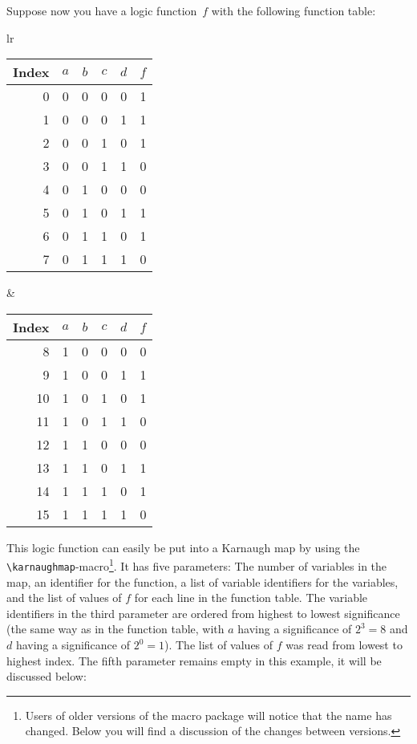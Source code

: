 \documentclass{article}
\begin{document}
Suppose now you have a logic function~$f$ with the following function table:

\begin{center}

    \begin{tabular}{lr}
        \begin{tabular}[t]{r|cccc|c}
            Index & $a$ & $b$ & $c$ & $d$ & $f$ \\
            \hline
            0     & 0   & 0   & 0   & 0   & 1   \\
            1     & 0   & 0   & 0   & 1   & 1   \\
            2     & 0   & 0   & 1   & 0   & 1   \\
            3     & 0   & 0   & 1   & 1   & 0   \\
            4     & 0   & 1   & 0   & 0   & 0   \\
            5     & 0   & 1   & 0   & 1   & 1   \\
            6     & 0   & 1   & 1   & 0   & 1   \\
            7     & 0   & 1   & 1   & 1   & 0   \\
        \end{tabular}
         &
        \begin{tabular}[t]{r|cccc|c}
            Index & $a$ & $b$ & $c$ & $d$ & $f$ \\
            \hline
            8     & 1   & 0   & 0   & 0   & 0   \\
            9     & 1   & 0   & 0   & 1   & 1   \\
            10    & 1   & 0   & 1   & 0   & 1   \\
            11    & 1   & 0   & 1   & 1   & 0   \\
            12    & 1   & 1   & 0   & 0   & 0   \\
            13    & 1   & 1   & 0   & 1   & 1   \\
            14    & 1   & 1   & 1   & 0   & 1   \\
            15    & 1   & 1   & 1   & 1   & 0   \\
        \end{tabular}
    \end{tabular}
\end{center}

This logic function can easily be put into a Karnaugh map by using the
\verb|\karnaughmap|-macro\footnote{Users of older versions of the macro
    package will notice that the name has changed. Below you will find a
    discussion of the changes between versions.}. It has five parameters: The
number of variables in the  map, an identifier for the function, a list of
variable identifiers for the variables, and the list of  values of $f$ for
each line in the function table. The variable identifiers in the third
parameter are ordered from highest to lowest significance (the same way as in
the function table, with $a$ having a significance of $2^3=8$ and $d$ having a
significance of $2^0=1$). The list of values of $f$ was read from lowest to
highest index. The fifth parameter remains empty in this example, it will be
discussed below:
\end{document}
